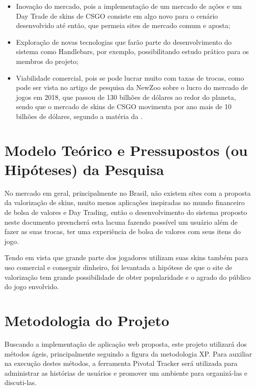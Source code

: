 \begin{itemize}
	\item Inovação do mercado, pois a implementação de um mercado de ações e um Day Trade de skins de CSGO consiste em algo novo para o cenário desenvolvido até então, que permeia sites de mercado comum e aposta;
	\item Exploração de novas tecnologias que farão parte do desenvolvimento do sistema como Handlebars, por exemplo, possibilitando estudo prático para os membros do projeto;
	\item Viabilidade comercial, pois se pode lucrar muito com taxas de trocas, como pode ser vista no artigo de pesquisa da NewZoo sobre o lucro do mercado de jogos em 2018, que passou de 130 bilhões de dólares ao redor do planeta, sendo que o mercado de skins de CSGO movimenta por ano mais de 10 bilhões de dólares, segundo a matéria da .
\end{itemize} 

\chapter{Modelo Teórico e Pressupostos (ou Hipóteses) da Pesquisa}
No mercado em geral, principalmente no Brasil, não existem sites com a proposta da valorização de skins, muito menos aplicações inspiradas no mundo financeiro de bolsa de valores e Day Trading, então o desenvolvimento do sistema proposto neste documento preencherá esta lacuna fazendo possível um usuário além de fazer as suas trocas, ter uma experiência de bolsa de valores com seus itens do jogo. 

Tendo em vista que grande parte dos jogadores utilizam suas skins também para uso comercial e conseguir dinheiro, foi levantada a hipótese de que o site de valorização tem grande possibilidade de obter popularidade e o agrado do público do jogo envolvido.

\chapter{Metodologia do Projeto}
Buscando a implementação de aplicação web proposta, este projeto utilizará dos métodos ágeis, principalmente seguindo a figura da metodologia XP. Para auxiliar na execução destes métodos, a ferramenta Pivotal Tracker será utilizada para administrar as histórias de usuários e promover um ambiente para organizá-las e discuti-las.

